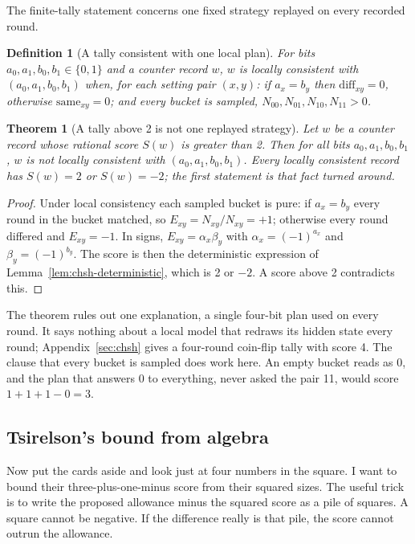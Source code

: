 \documentclass[11pt,twoside]{article}
\theoremstyle{thielethm}
\newtheorem{theorem}{Theorem}[section]
\theoremstyle{thieledef}
\newtheorem{definition}{Definition}[section]
\theoremstyle{thieledef}
\theoremstyle{thieledef}
\theoremstyle{thielethm}
\theoremstyle{thieleobs}
\theoremstyle{thielethm}
\begin{document}
The finite-tally statement concerns one fixed strategy replayed on every recorded round.

\begin{definition}[A tally consistent with one local plan]
For bits $a_0, a_1, b_0, b_1 \in \{0, 1\}$ and a counter record $w$, $w$ is locally consistent with
$(a_0, a_1, b_0, b_1)$ when, for each setting pair $(x, y)$: if $a_x = b_y$ then
$\mathrm{diff}_{xy} = 0$, otherwise $\mathrm{same}_{xy} = 0$; and every bucket is sampled,
$N_{00}, N_{01}, N_{10}, N_{11} > 0$.
\end{definition}

\begin{theorem}[A tally above 2 is not one replayed strategy]
Let $w$ be a counter record whose rational score $S(w)$ is greater than 2.
Then for all bits $a_0, a_1, b_0, b_1$, $w$ is not locally consistent with
$(a_0, a_1, b_0, b_1)$. Every locally consistent record has $S(w) = 2$ or $S(w) = -2$; the first statement is that fact turned around.
\end{theorem}

\begin{proof}
Under local consistency each sampled bucket is pure: if $a_x = b_y$ every round in the
bucket matched, so $E_{xy} = N_{xy}/N_{xy} = +1$; otherwise every round differed and
$E_{xy} = -1$. In signs, $E_{xy} = \alpha_x \beta_y$ with $\alpha_x = (-1)^{a_x}$ and
$\beta_y = (-1)^{b_y}$. The score is then the deterministic expression of
Lemma~\ref{lem:chsh-deterministic}, which is 2 or $-2$. A score above 2 contradicts this.
\end{proof}

The theorem rules out one explanation, a single four-bit plan used on every round. It says
nothing about a local model that redraws its hidden state every round; Appendix~\ref{sec:chsh} gives a four-round coin-flip tally with score 4. The clause that every bucket is sampled does work here. An empty bucket reads as 0, and the plan that answers 0 to everything, never asked the pair 11, would score $1 + 1 + 1 - 0 = 3$.

\subsection{Tsirelson's bound from algebra}


Now put the cards aside and look just at four numbers in the square. I want
to bound their three-plus-one-minus score from their squared sizes. The useful
trick is to write the proposed allowance minus the squared score as a pile
of squares. A square cannot be negative. If the difference really is that
pile, the score cannot outrun the allowance.
\end{document}
